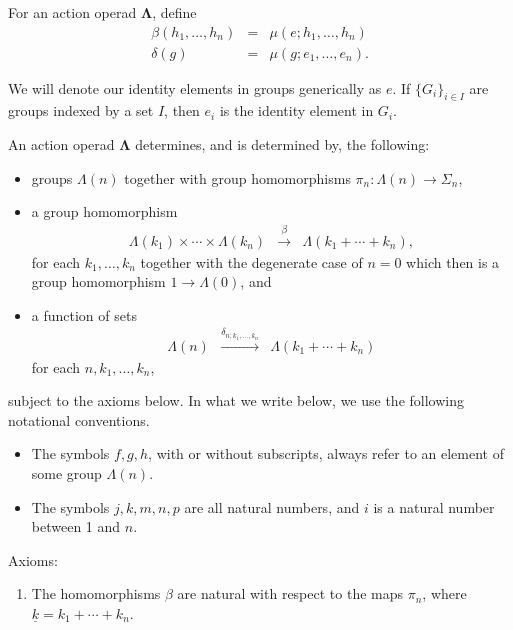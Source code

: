 \documentclass{amsbook} %
\newcommand{\mb}{\mathbf}
\numberwithin{section}{chapter}
\begin{document}
\begin{Defi}\label{Defi:aop_bl}
For an action operad $\mb{\Lambda}$,  define
\[
\begin{array}{rcl}
\beta(h_{1}, \ldots, h_{n}) &=& \mu(e; h_{1}, \ldots, h_{n}) \\
\delta(g) &=& \mu(g; e_{1}, \ldots, e_{n}).
\end{array}
\]
\end{Defi}

\begin{nota}
We will denote our identity elements in groups generically as $e$. If $\{ G_{i} \}_{i \in I}$ are groups indexed by a set $I$, then $e_{i}$ is the identity element in $G_{i}$.
\end{nota}

\begin{thm}\label{thm:charAOp}
An action operad $\mb{\Lambda}$ determines, and is determined by, the following:
\begin{itemize}
\item groups $\Lambda(n)$ together with group homomorphisms $\pi_{n}:\Lambda(n) \rightarrow \Sigma_{n}$,
\item a group homomorphism
\[
\begin{array}{rcl}
\Lambda(k_{1}) \times \cdots \times \Lambda(k_{n}) & \stackrel{\beta}{\longrightarrow} & \Lambda(k_{1} + \cdots + k_{n}),
\end{array}
\]
for each $k_{1}, \ldots, k_{n}$ together with the degenerate case of $n=0$ which then is a group homomorphism $1 \to \Lambda(0)$, and
\item a function of sets
\[
\begin{array}{rcl}
\Lambda(n) & \stackrel{\delta_{n; k_{1}, \ldots, k_{n}}}{\longrightarrow} & \Lambda(k_{1} + \cdots + k_{n})
\end{array}
\]
for each $n, k_{1}, \ldots, k_{n}$,
\end{itemize}
subject to the axioms below.  In what we write below, we use the following notational conventions.
\begin{itemize}
\item The symbols $f,g,h$, with or without subscripts, always refer to an element of some group $\Lambda(n)$.
\item The symbols $j,k,m,n,p$ are all natural numbers, and $i$ is a natural number between 1 and $n$.
\end{itemize}
Axioms:
\begin{enumerate}
\item\label{eq1} The homomorphisms $\beta$ are natural with respect to the maps $\pi_{n}$, where $\underline{k} = k_{1} + \cdots + k_{n}$.

\end{enumerate}
\end{thm}
\end{document}
